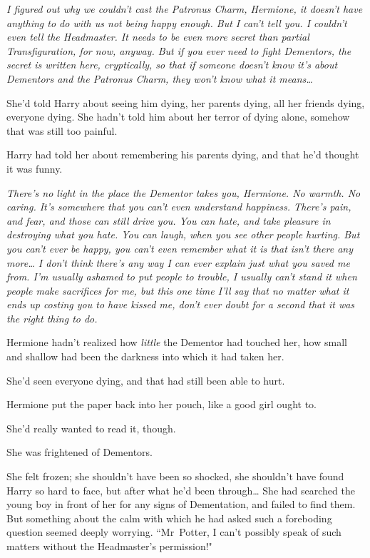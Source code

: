 \emph{I figured out why we couldn't cast the Patronus Charm, Hermione, it doesn't have anything to do with us not being happy enough. But I can't tell you. I couldn't even tell the Headmaster. It needs to be even more secret than partial Transfiguration, for now, anyway. But if you ever need to fight Dementors, the secret is written here, cryptically, so that if someone doesn't know it's about Dementors and the Patronus Charm, they won't know what it means{\ldots}}

She'd told Harry about seeing him dying, her parents dying, all her friends dying, everyone dying. She hadn't told him about her terror of dying alone, somehow that was still too painful.

Harry had told her about remembering his parents dying, and that he'd thought it was funny.

\emph{There's no light in the place the Dementor takes you, Hermione. No warmth. No caring. It's somewhere that you can't even understand happiness. There's pain, and fear, and those can still drive you. You can hate, and take pleasure in destroying what you hate. You can laugh, when you see other people hurting. But you can't ever be happy, you can't even remember what it is that isn't there any more{\ldots} I don't think there's any way I can ever explain just what you saved me from. I'm usually ashamed to put people to trouble, I usually can't stand it when people make sacrifices for me, but this one time I'll say that no matter what it ends up costing you to have kissed me, don't ever doubt for a second that it was the right thing to do.}

Hermione hadn't realized how \emph{little} the Dementor had touched her, how small and shallow had been the darkness into which it had taken her.

She'd seen everyone dying, and that had still been able to hurt.

Hermione put the paper back into her pouch, like a good girl ought to.

She'd really wanted to read it, though.

She was frightened of Dementors.


She felt frozen; she shouldn't have been so shocked, she shouldn't have found Harry so hard to face, but after what he'd been through{\ldots} She had searched the young boy in front of her for any signs of Dementation, and failed to find them. But something about the calm with which he had asked such a foreboding question seemed deeply worrying. ``Mr~Potter, I can't possibly speak of such matters without the Headmaster's permission!"


